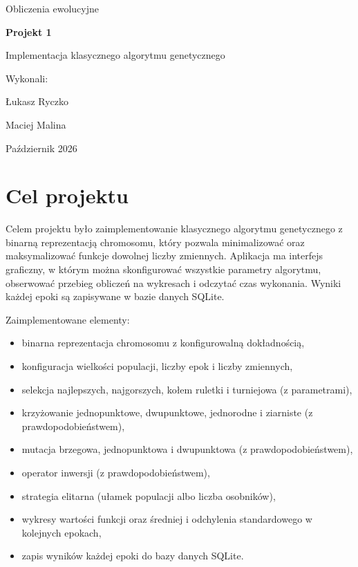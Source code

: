 \documentclass[11pt,a4paper]{article}
\begin{document}
\begin{titlepage}
  \centering
  \vspace*{3cm}
  {\Large Obliczenia ewolucyjne\par}
  \vspace{1.2cm}
  {\Huge\bfseries Projekt 1\par}
  \vspace{0.4cm}
  {\LARGE Implementacja klasycznego algorytmu genetycznego\par}
  \vspace{2.5cm}
  {\large Wykonali:\par}
  \vspace{0.3cm}
  {\Large Łukasz Ryczko\par Maciej Malina\par}
  \vfill
  {\large Październik 2026\par}
\end{titlepage}

\tableofcontents
\newpage

\section{Cel projektu}

Celem projektu było zaimplementowanie klasycznego algorytmu genetycznego z binarną reprezentacją
chromosomu, który pozwala minimalizować oraz maksymalizować funkcje dowolnej liczby zmiennych.
Aplikacja ma interfejs graficzny, w którym można skonfigurować wszystkie parametry algorytmu,
obserwować przebieg obliczeń na wykresach i odczytać czas wykonania. Wyniki każdej epoki są
zapisywane w bazie danych SQLite.

Zaimplementowane elementy:
\begin{itemize}
  \item binarna reprezentacja chromosomu z konfigurowalną dokładnością,
  \item konfiguracja wielkości populacji, liczby epok i liczby zmiennych,
  \item selekcja najlepszych, najgorszych, kołem ruletki i turniejowa (z parametrami),
  \item krzyżowanie jednopunktowe, dwupunktowe, jednorodne i ziarniste (z prawdopodobieństwem),
  \item mutacja brzegowa, jednopunktowa i dwupunktowa (z prawdopodobieństwem),
  \item operator inwersji (z prawdopodobieństwem),
  \item strategia elitarna (ułamek populacji albo liczba osobników),
  \item wykresy wartości funkcji oraz średniej i odchylenia standardowego w kolejnych epokach,
  \item zapis wyników każdej epoki do bazy danych SQLite.
\end{itemize}
\end{document}
